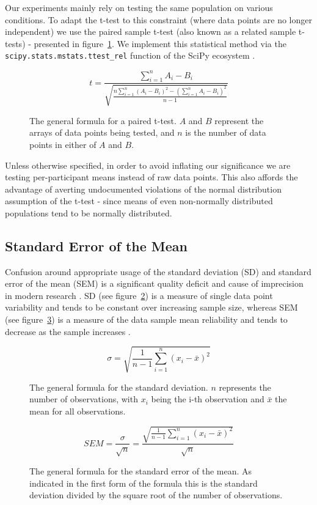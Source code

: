 	    Our experiments mainly rely on testing the same population on various conditions.
	    To adapt the t-test to this constraint (where data points are no longer independent) we use the paired sample t-test (also known as a related sample t-tests) - presented in figure~\ref{eq:m_sa_pt}.
	    We implement this statistical method via the \colorbox{vlg}{\texttt{scipy.stats.mstats.ttest\_rel}} function of the SciPy ecosystem \cite{scipy,Oliphant2007}.

	    \begin{figure}[H]
		\[ t = \frac{\sum\limits_{i=1}^n A_{i}-B_{i}}{\sqrt{\frac{n \sum\limits_{i=1}^n (A_{i}-B_{i})^{2} - \left(\sum\limits_{i=1}^n A_{i}-B_{i}\right)^{2}}{n-1}}} \]
		\caption{The general formula for a paired t-test. $A$ and $B$ represent the arrays of data points being tested, and $n$ is the number of data points in either of $A$ and $B$.}
		\label{eq:m_sa_pt}
	    \end{figure}
	    
	    Unless otherwise specified, in order to avoid inflating our significance we are testing per-participant means instead of raw data points.
	    This also affords the advantage of averting undocumented violations of the normal distribution assumption of the t-test -
	    since means of even non-normally distributed populations tend to be normally distributed.  
	\subsection{Standard Error of the Mean}\label{sec:m_sa_se}
	    Confusion around appropriate usage of the standard deviation (SD) and standard error of the mean (SEM) is a significant quality deficit and cause of imprecision in modern research \cite{Nagele2003}.
	    SD (see figure~\ref{eq:m_sa_sd}) is a measure of single data point variability and tends to be constant over increasing sample size, 
	    whereas SEM (see figure~\ref{eq:m_sa_se}) is a measure of the data sample mean reliability and tends to decrease as the sample increases \cite{Altman2005,Streiner1996}.
	    
	    \begin{multicols}{2}
		\begin{figure}[H]
		    \[ \sigma = \sqrt{\frac{1}{n-1} \sum\limits_{i=1}^n (x_i - \bar{x})^2} \]
		    \caption{The general formula for the standard deviation. $n$ represents the number of observations, with $x_i$ being the i-th observation and $\bar{x}$ the mean for all observations.}
		    \label{eq:m_sa_sd}
		\end{figure}
		\begin{figure}[H]
		    \[ SEM = \frac{\sigma}{\sqrt{n}} = \frac{\sqrt{\frac{1}{n-1} \sum\limits_{i=1}^n (x_i - \bar{x})^2}}{\sqrt{n}} \]
		    \caption{The general formula for the standard error of the mean. As indicated in the first form of the formula this is the standard deviation divided by the square root of the number of observations.}
		    \label{eq:m_sa_se}
		\end{figure}
	    \end{multicols}
	    
